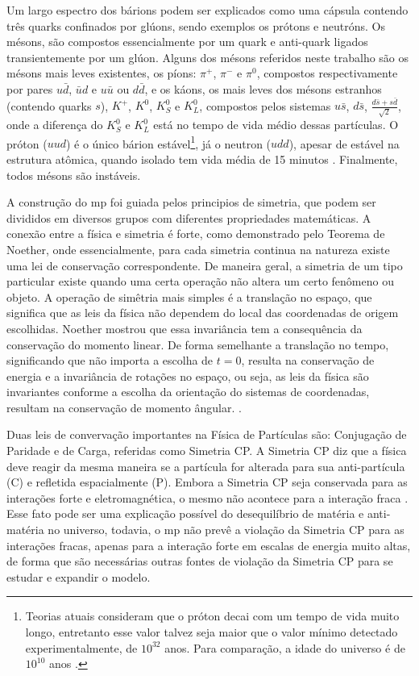  
Um largo espectro dos bárions podem ser explicados como uma cápsula contendo
três quarks confinados por glúons, sendo exemplos os prótons e neutróns. Os mésons, 
são compostos essencialmente por um quark e anti-quark ligados
transientemente por um glúon. Alguns dos mésons referidos neste trabalho são
os mésons mais leves existentes, os píons: $\pi^{+}$,
$\pi^{-}$ e $\pi^{0}$, compostos respectivamente por pares $u\bar{d}$, $\bar{u}d$ e
$u\bar{u}$ ou $d\bar{d}$, e os káons, os mais leves dos mésons estranhos
(contendo quarks $s$), $K^{+}$, $K^{0}$, $K^{0}_{S}$ e $K^{0}_{L}$, 
compostos pelos sistemas $u\bar{s}$, $d\bar{s}$,
$\frac{d\bar{s}+s\bar{d}}{\sqrt{2}}$, onde a diferença do $K^{0}_{S}$ e
$K^{0}_{L}$ está no tempo de vida médio dessas partículas. 
O próton ($uud$) é o único bárion estável\footnote{Teorias atuais consideram que
o próton decai com um tempo de vida muito longo, entretanto esse valor talvez seja maior 
que o valor mínimo detectado experimentalmente, de $10^{32}$ anos. 
Para comparação, a idade do universo é de $10^{10}$ anos \cite{Beiser}.}, 
já o neutron ($udd$), apesar de estável na estrutura atômica,
quando isolado tem vida média de 15 minutos \cite{Intro_Standard}. Finalmente, 
todos mésons são instáveis.

A construção do \gls{mp} foi guiada pelos principios 
de simetria, que podem ser divididos em diversos grupos com diferentes
propriedades matemáticas. A conexão entre a física e simetria é forte, como
demonstrado pelo Teorema de Noether, onde essencialmente, para cada simetria
continua na natureza existe uma lei de conservação correspondente. De maneira
geral, a simetria de um tipo particular existe quando uma certa operação não
altera um certo fenômeno ou objeto. A operação de simêtria mais simples é a
translação no espaço, que significa que as leis da física não dependem do local
das coordenadas de origem escolhidas. Noether mostrou que essa invariância tem a
consequência da conservação do momento linear. De forma semelhante a translação
no tempo, significando que não importa a escolha de $t = 0$, resulta na
conservação de energia e a invariância de rotações no espaço, ou seja, as leis
da física são invariantes conforme a escolha da orientação do sistemas de
coordenadas, resultam na conservação de momento ângular.
\cite{Intro_Standard,Feynman}. 

Duas leis de convervação importantes na Física de
Partículas são: Conjugação de Paridade e de Carga, referidas como Simetria CP. 
A Simetria CP diz que a física deve reagir
da mesma maneira se a partícula for alterada para sua anti-partícula (C) e refletida
espacialmente (P).
Embora a Simetria CP seja conservada para as interações forte
e eletromagnética, o mesmo não acontece para a interação fraca
\cite{Intro_Nuclear}. Esse fato pode ser uma explicação possível do
desequilíbrio de matéria e anti-matéria no universo, todavia, o \gls{mp} não
prevê a violação da Simetria CP para as interações fracas, apenas para a
interação forte em escalas de energia muito altas, de forma que são necessárias
outras fontes de violação da Simetria CP para se estudar e expandir o modelo.
 
